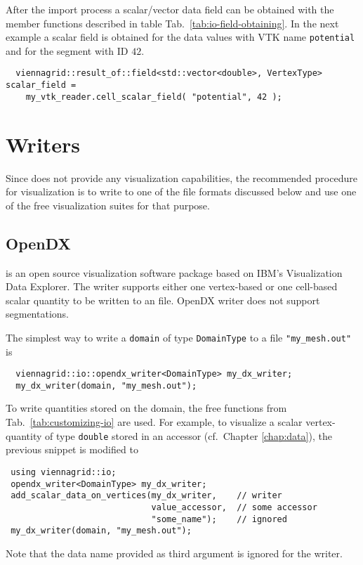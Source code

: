  \pagebreak
 
 After the import process a scalar/vector data field can be obtained with the member functions described in table Tab.~\ref{tab:io-field-obtaining}. In the next example a scalar field is obtained for the data values with VTK name \texttt{potential} and for the segment with ID $42$.
 
 \begin{lstlisting}
  viennagrid::result_of::field<std::vector<double>, VertexType> scalar_field =
    my_vtk_reader.cell_scalar_field( "potential", 42 );
 \end{lstlisting}
 
 
 
\section{Writers}
Since {\ViennaGrid} does not provide any visualization capabilities, the recommended procedure for visualization is 
to write to one of the file formats discussed below and use one of the free visualization suites for that purpose.


 \subsection{OpenDX}
 {\OpenDX} \cite{opendx} is an open source visualization software package based on IBM's Visualization Data Explorer.
 The writer supports either one vertex-based or one cell-based scalar quantity to be written to an {\OpenDX} file. OpenDX writer does not support segmentations.

 The simplest way to write a \lstinline|domain| of type \lstinline|DomainType| to a file \lstinline|"my_mesh.out"| is
 \begin{lstlisting}
  viennagrid::io::opendx_writer<DomainType> my_dx_writer;
  my_dx_writer(domain, "my_mesh.out");
 \end{lstlisting}
 To write quantities stored on the domain, the free functions from Tab.~\ref{tab:customizing-io} are used.
 For example, to visualize a scalar vertex-quantity of type \lstinline|double| stored in an accessor (cf.~Chapter \ref{chap:data}), the previous snippet is modified to
 \begin{lstlisting}
 using viennagrid::io;
 opendx_writer<DomainType> my_dx_writer;
 add_scalar_data_on_vertices(my_dx_writer,    // writer
                             value_accessor,  // some accessor
                             "some_name");    // ignored
 my_dx_writer(domain, "my_mesh.out");
 \end{lstlisting}
 Note that the data name provided as third argument is ignored for the {\OpenDX} writer.

